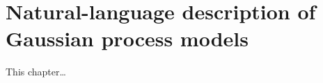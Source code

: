 
\inbpdocument

\chapter{Natural-language description of Gaussian process models}
\label{ch:description}

This chapter\dots

\outbpdocument{


}
